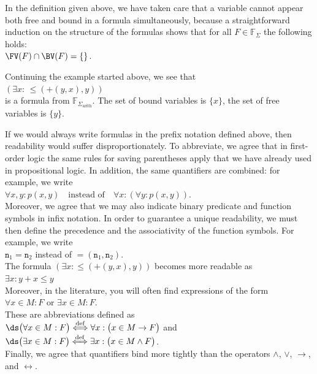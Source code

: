In the definition given above, we have taken care that a variable cannot appear both free and bound in a
formula simultaneously, because a straightforward induction on the structure of the formulas shows that for all 
$F \in \mathbb{F}_\Sigma$ the following holds:  
\\[0.2cm]
\hspace*{1.3cm}
$ \FV(F) \cap \BV(F) = \{\}$. 

\exampleEng
Continuing the example started above, we see that \\[0.2cm]
\hspace*{1.3cm} $(\exists x \colon\, \leq\!(\mathtt{+}(y, x),y))$ \\[0.2cm]
is a formula from $\mathbb{F}_{\Sigma_{\mathrm{arith}}}$. 
The set of bound variables is $\{x\}$, the set of free variables is 
$\{ y \}$. \eox

If we would always write formulas in the prefix notation defined above, then readability would suffer
disproportionately.  
To abbreviate, we agree that in first-order logic the same rules for saving parentheses apply that we have
already used in propositional logic. In addition, the same quantifiers are combined: for example, we write   
\\[0.2cm]
\hspace*{1.3cm}
$\forall x, y \colon p(x, y)  \quad \text{instead of} \quad \forall x \colon ( \forall y \colon p(x,y))$.
\\[0.2cm]
Moreover, we agree that we may also indicate binary predicate and function symbols in infix notation.
In order to guarantee a unique readability, we must then define the precedence and the associativity of the
function symbols.  For example, we write \\[0.2cm]
\hspace*{1.3cm} $\mathtt{n}_1 = \mathtt{n}_2$  \quad instead of \quad $=(\mathtt{n}_1, \mathtt{n}_2)$. \\[0.2cm]
The formula $(\exists x \colon \leq(\mathtt{+}(y, x),y))$ becomes more readable as \\[0.2cm]
\hspace*{1.3cm} $\exists x \colon y + x \leq y$ \\[0.2cm]
Moreover, in the literature, you will often find expressions of the form
\\[0.2cm]
\hspace*{1.3cm}
$\forall x \in M: F$ \quad or \quad $\exists x \in M: F$.
\\[0.2cm]
These are abbreviations defined as
\\[0.2cm]
\hspace*{1.3cm}
$\ds \bigl(\forall x \in M: F\bigr) \stackrel{\mathrm{def}}{\Longleftrightarrow} \forall x: \bigl(x \in M \rightarrow F\bigr)$
\quad and \quad 
$\ds\bigl(\exists x \in M: F\bigr) \stackrel{\mathrm{def}}{\Longleftrightarrow} \exists x: \bigl(x \in M \wedge F\bigr)$.
\\[0.2cm]
Finally, we agree that quantifiers bind more tightly than the operators $\wedge$, $\vee$, $\rightarrow$, and
$\leftrightarrow$. 

